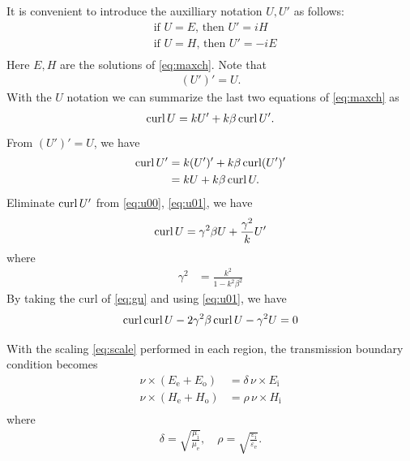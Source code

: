 It is convenient to introduce the auxilliary notation $U, U'$ as follows:
\begin{equation}
  \begin{split}
    &\text{if  }U=E\text{,  then  }U'=iH \\
    &\text{if  }U=H\text{,  then  }U'=-iE \\
  \end{split}
\end{equation}
Here $E, H$ are the solutions of \eqref{eq:maxch}. Note that 
\begin{align*}
  (U')'=U.
\end{align*}
With the $U$ notation we can summarize the last two equations of \eqref{eq:maxch} as
\begin{align}\label{eq:u00}
  \operatorname{curl} U = k U' + k\beta\operatorname{curl} U'.
\end{align}
From $(U')'=U$, we have
\begin{equation}\label{eq:u01}
  \begin{split}
    \operatorname{curl} U' &= k (U')' + k\beta\operatorname{curl} (U')' \\ 
             &= k U + k\beta\operatorname{curl} U.
  \end{split}
\end{equation}
Eliminate $\operatorname{curl} U'$ from \eqref{eq:u00}, \eqref{eq:u01}, we have 
\begin{align}\label{eq:gu}
  \operatorname{curl} U = \gamma^2\beta U + \frac{\gamma^2}{k} U'
\end{align}
where
\begin{align}
  \gamma^2 &=\frac{k^2}{1-k^2\beta^2} 
\end{align}
By taking the curl of \eqref{eq:gu} and using \eqref{eq:u01}, we have
\begin{align}
  \operatorname{curl}\operatorname{curl} U - 2\gamma^2\beta\operatorname{curl} U - \gamma^2 U = 0
\end{align}

With the scaling \eqref{eq:scale} performed in each region, the transmission boundary condition becomes
\begin{equation}
\begin{split}
  \nu\times\left(E_\text{e} + E_\text{o}\right) &= \delta\,\nu\times E_\text{i} \\
  \nu\times\left(H_\text{e} + H_\text{o}\right) &= \rho\,\nu\times H_\text{i} \\
\end{split}
\end{equation}
where
\begin{align}
  \delta = \sqrt{\frac{\mu_\text{i}}{\mu_\text{e}}}, \quad \rho= \sqrt{\frac{\varepsilon_\text{i}}{\varepsilon_\text{e}}}. 
\end{align}

